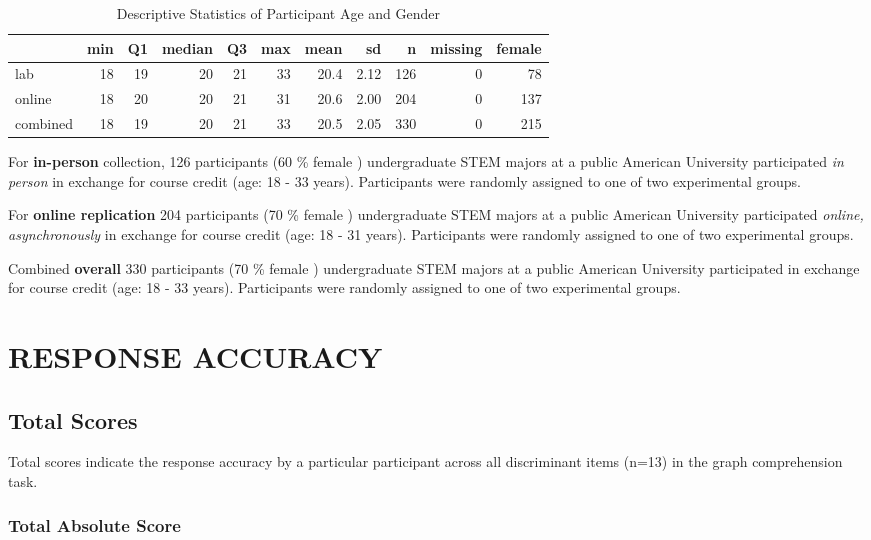 \documentclass[
  letterpaper,
  DIV=11,
  numbers=noendperiod]{scrreprt}
\begin{document}
\begin{table}

\caption{Descriptive Statistics of Participant Age and Gender}
\centering
\begin{tabular}[t]{l|r|r|r|r|r|r|r|r|r|r}
\hline
  & min & Q1 & median & Q3 & max & mean & sd & n & missing & female\\
\hline
lab & 18 & 19 & 20 & 21 & 33 & 20.4 & 2.12 & 126 & 0 & 78\\
\hline
online & 18 & 20 & 20 & 21 & 31 & 20.6 & 2.00 & 204 & 0 & 137\\
\hline
combined & 18 & 19 & 20 & 21 & 33 & 20.5 & 2.05 & 330 & 0 & 215\\
\hline
\end{tabular}
\end{table}

For \textbf{in-person} collection, 126 participants (60 \% female )
undergraduate STEM majors at a public American University participated
\emph{in person} in exchange for course credit (age: 18 - 33 years).
Participants were randomly assigned to one of two experimental groups.

For \textbf{online replication} 204 participants (70 \% female )
undergraduate STEM majors at a public American University participated
\emph{online, asynchronously} in exchange for course credit (age: 18 -
31 years). Participants were randomly assigned to one of two
experimental groups.

Combined \textbf{overall} 330 participants (70 \% female ) undergraduate
STEM majors at a public American University participated in exchange for
course credit (age: 18 - 33 years). Participants were randomly assigned
to one of two experimental groups.

\hypertarget{response-accuracy}{%
\section{RESPONSE ACCURACY}\label{response-accuracy}}

\hypertarget{total-scores}{%
\subsection{Total Scores}\label{total-scores}}

Total scores indicate the response accuracy by a particular participant
across all discriminant items (n=13) in the graph comprehension task.

\hypertarget{total-absolute-score}{%
\subsubsection{Total Absolute Score}\label{total-absolute-score}}
\end{document}
